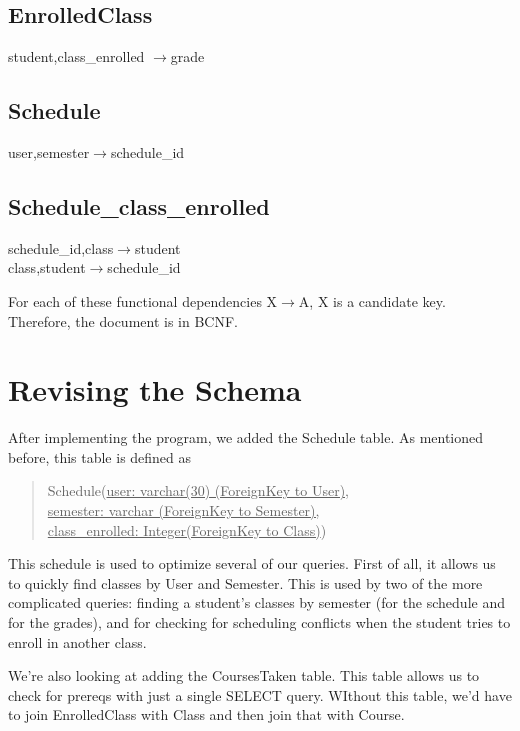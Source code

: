 \documentclass[11pt,oneside,a4paper]{article}
\begin{document}
\subsection{EnrolledClass}
\hspace*{0.5in}student,class\_enrolled $\rightarrow$grade


\subsection{Schedule}
\hspace*{0.5in}user,semester$\rightarrow$schedule\_id 


\subsection{Schedule\_class\_enrolled}
\hspace*{0.5in}schedule\_id,class$\rightarrow$student \\
\hspace*{0.5in}class,student$\rightarrow$schedule\_id 

For each of these functional dependencies X$\rightarrow$A, X is a candidate
key. Therefore, the document is in BCNF.
\section{Revising the Schema}
After implementing the program, we added the Schedule table. As mentioned
before, this table is defined as 
\begin{quote}
Schedule(\underline{user: varchar(30) (ForeignKey to User),} \\
\underline{semester: varchar (ForeignKey to Semester),}\\
\underline{class\_enrolled: Integer(ForeignKey to Class)})
\end{quote}

This schedule is used to optimize several of our queries. First of all, it
allows us to quickly find classes by User and Semester. This is used by two of
the more complicated queries: finding a student's classes by semester (for the
schedule and for the grades), and for checking for scheduling conflicts when
the student tries to enroll in another class.

We're also looking at adding the CoursesTaken table. This table allows us to
check for prereqs with just a single SELECT query. WIthout this table, we'd
have to join EnrolledClass with Class and then join that with Course.
\end{document}

